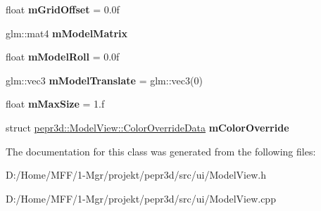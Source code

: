 \begin{DoxyCompactItemize}
\item 
\mbox{\label{classpepr3d_1_1_model_view_aaad7b91e2a946b38bd930d108d07111e}} 
float {\bfseries m\+Grid\+Offset} = 0.\+0f
\item 
\mbox{\label{classpepr3d_1_1_model_view_a9fd29e6f6da7b236ee720c831d2d761a}} 
glm\+::mat4 {\bfseries m\+Model\+Matrix}
\item 
\mbox{\label{classpepr3d_1_1_model_view_ab76d51db2a07baaffd576603b68ce123}} 
float {\bfseries m\+Model\+Roll} = 0.\+0f
\item 
\mbox{\label{classpepr3d_1_1_model_view_a2435a4fd900c17ab27bbe82f58864614}} 
glm\+::vec3 {\bfseries m\+Model\+Translate} = glm\+::vec3(0)
\item 
\mbox{\label{classpepr3d_1_1_model_view_adf575a92a3398753c447f0f15e4ad79f}} 
float {\bfseries m\+Max\+Size} = 1.f
\item 
\mbox{\label{classpepr3d_1_1_model_view_a8f76b4e84b17567332ac41564b9b70d8}} 
struct \mbox{\hyperlink{structpepr3d_1_1_model_view_1_1_color_override_data}{pepr3d\+::\+Model\+View\+::\+Color\+Override\+Data}} {\bfseries m\+Color\+Override}
\end{DoxyCompactItemize}


The documentation for this class was generated from the following files\+:\begin{DoxyCompactItemize}
\item 
D\+:/\+Home/\+M\+F\+F/1-\/\+Mgr/projekt/pepr3d/src/ui/Model\+View.\+h\item 
D\+:/\+Home/\+M\+F\+F/1-\/\+Mgr/projekt/pepr3d/src/ui/Model\+View.\+cpp\end{DoxyCompactItemize}
